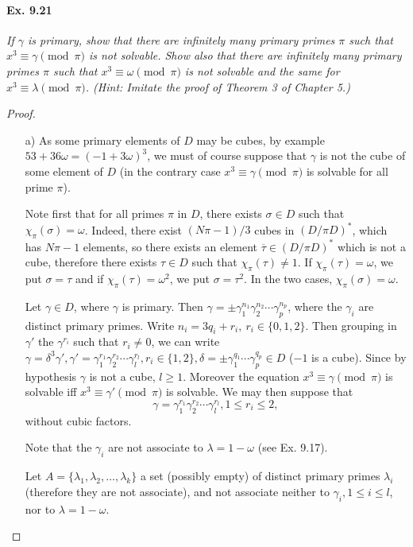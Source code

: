 \documentclass[11pt,a4paper]{article}
\begin{document}
\paragraph{Ex. 9.21}
{\it If $\gamma$ is primary, show that there are infinitely many primary primes $\pi$ such that $x^3 \equiv \gamma \pmod \pi$ is not solvable. Show also that there are infinitely many primary primes $\pi$ such that $x^3 \equiv \omega \pmod \pi$ is not solvable and the same for $x^3 \equiv \lambda \pmod \pi$. (Hint: Imitate the proof of Theorem 3 of Chapter 5.)
}

\begin{proof}
\begin{enumerate}
\item[a)] As some primary elements of $D$ may be cubes, by example $53 + 36 \omega = (-1 + 3 \omega)^3$, we must of course suppose that $\gamma$ is not the cube of some element of $D$ (in the contrary case $x^3 \equiv \gamma \pmod \pi $ is solvable for all prime $\pi$).

Note first that for all primes $\pi$ in $D$, there exists $\sigma \in D$ such that $\chi_\pi(\sigma) = \omega$. Indeed, there exist $(N\pi - 1)/3$ cubes in $(D/\pi D)^*$, which has $N\pi - 1$ elements, so there exists an element $\overline{\tau} \in (D/\pi D)^*$ which is not a cube, therefore there exists $\tau \in D$ such that $\chi_\pi(\tau) \neq 1$. If $\chi_\pi(\tau) = \omega$, we put $\sigma = \tau$ and if $\chi_\pi(\tau) = \omega^2$, we put $\sigma = \tau^2$. In the two cases, $\chi_\pi(\sigma) = \omega$.

\bigskip

Let $\gamma \in D$, where $\gamma$ is primary. Then $\gamma = \pm \gamma_1^{n_1}\gamma_2^{n_2}\cdots\gamma_p^{n_p}$, where the $\gamma_i$ are distinct primary primes. 
Write $n_i = 3q_i + r_i, \ r_i \in \{0,1,2\}$. Then grouping in $\gamma'$ the $\gamma^{r_i}$ such that $r_i \ne 0$, we can write $\gamma = \delta^3 \gamma', \gamma' = \gamma_1^{r_1} \gamma_2^{r_2}\cdots \gamma_l^{r_l}, r_i \in \{1,2\}, \delta = \pm \gamma_1^{q_1}\cdots\gamma_p^{q_p} \in D$ ($-1$ is a cube). Since by hypothesis $\gamma$ is not a cube, $l\geq 1$. Moreover the equation $x^3 \equiv \gamma \pmod \pi$ is solvable iff $x^3 \equiv \gamma' \pmod \pi$ is solvable. We may then suppose that $$\gamma = \gamma_1^{r_1} \gamma_2^{r_2}\cdots \gamma_l^{r_l}, 1\leq r_i \leq 2,$$ without cubic factors.

Note that the $\gamma_i$ are not associate to $\lambda = 1-\omega$ (see Ex. 9.17).

Let $A = \{\lambda_1,\lambda_2,\ldots, \lambda_k\}$  a set (possibly empty) of distinct primary primes $\lambda_i$ (therefore  they are not associate), and not associate neither to $\gamma_i, 1 \leq i \leq l$, nor to $\lambda = 1 - \omega$.


\end{enumerate}
\end{proof}
\end{document}
